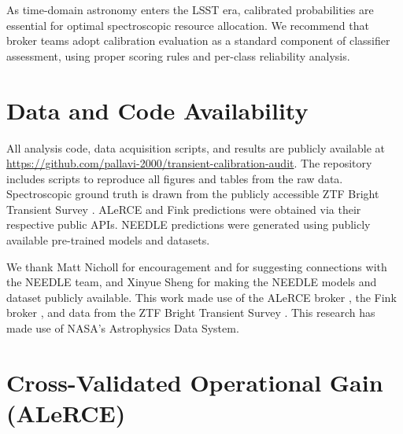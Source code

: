 \documentclass[twocolumn]{aastex631}
\begin{document}
As time-domain astronomy enters the LSST era, calibrated probabilities are essential for optimal spectroscopic resource allocation. We recommend that broker teams adopt calibration evaluation as a standard component of classifier assessment, using proper scoring rules and per-class reliability analysis.


\section*{Data and Code Availability}

All analysis code, data acquisition scripts, and results are publicly available at \url{https://github.com/pallavi-2000/transient-calibration-audit}. The repository includes scripts to reproduce all figures and tables from the raw data. Spectroscopic ground truth is drawn from the publicly accessible ZTF Bright Transient Survey \citep{fremling2020, perley2020}. ALeRCE and Fink predictions were obtained via their respective public APIs. NEEDLE predictions were generated using publicly available pre-trained models and datasets.


\begin{acknowledgments}
We thank Matt Nicholl for encouragement and for suggesting connections with the NEEDLE team, and Xinyue Sheng for making the NEEDLE models and dataset publicly available. This work made use of the ALeRCE broker \citep{forster2021}, the Fink broker \citep{moller2021}, and data from the ZTF Bright Transient Survey \citep{fremling2020, perley2020}. This research has made use of NASA's Astrophysics Data System.
\end{acknowledgments}







\appendix

\section{Cross-Validated Operational Gain (ALeRCE)} \label{app:cv}
\end{document}
